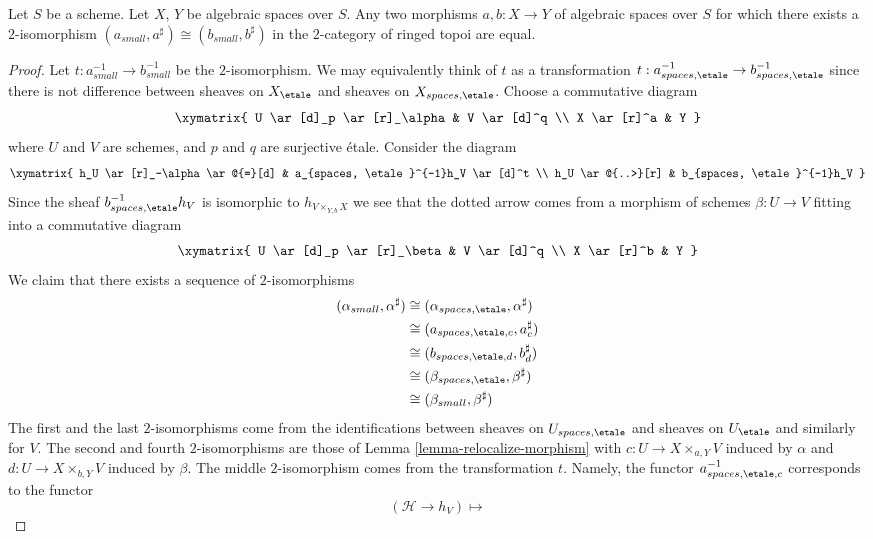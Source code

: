 \begin{lemma}
\label{lemma-faithful}
Let $S$ be a scheme.
Let $X$, $Y$ be algebraic spaces over $S$.
Any two morphisms $a, b : X \to Y$ of algebraic spaces over $S$
for which there exists a $2$-isomorphism
$(a_{small}, a^\sharp) \cong (b_{small}, b^\sharp)$
in the $2$-category of ringed topoi are equal.
\end{lemma}

\begin{proof}
Let $t : a_{small}^{-1} \to b_{small}^{-1}$ be the $2$-isomorphism.
We may equivalently think of $t$ as a transformation
$t : a_{spaces, \etale}^{-1} \to b_{spaces, \etale}^{-1}$
since there is not difference between sheaves on $X_\etale$
and sheaves on $X_{spaces, \etale}$.
Choose a commutative diagram
$$
\xymatrix{
U \ar[d]_p \ar[r]_\alpha  & V \ar[d]^q \\
X \ar[r]^a & Y
}
$$
where $U$ and $V$ are schemes, and $p$ and $q$ are surjective \'etale.
Consider the diagram
$$
\xymatrix{
h_U \ar[r]_-\alpha \ar@{=}[d] & a_{spaces, \etale}^{-1}h_V \ar[d]^t \\
h_U \ar@{..>}[r] & b_{spaces, \etale}^{-1}h_V
}
$$
Since the sheaf $b_{spaces, \etale}^{-1}h_V$ is isomorphic to
$h_{V \times_{Y, b} X}$ we see that the dotted arrow comes from a
morphism of schemes
$\beta : U \to V$ fitting into a commutative diagram
$$
\xymatrix{
U \ar[d]_p \ar[r]_\beta  & V \ar[d]^q \\
X \ar[r]^b & Y
}
$$
We claim that there exists a sequence of $2$-isomorphisms
\begin{align*}
(\alpha_{small}, \alpha^\sharp)
& \cong
(\alpha_{spaces, \etale}, \alpha^\sharp) \\
& \cong
(a_{spaces, \etale, c}, a_c^\sharp) \\
& \cong
(b_{spaces, \etale, d}, b_d^\sharp) \\
& \cong
(\beta_{spaces, \etale}, \beta^\sharp) \\
& \cong
(\beta_{small}, \beta^\sharp)
\end{align*}
The first and the last $2$-isomorphisms come from the identifications
between sheaves on $U_{spaces, \etale}$ and sheaves on
$U_\etale$ and similarly for $V$. The second and fourth
$2$-isomorphisms are those of
Lemma \ref{lemma-relocalize-morphism}
with $c : U \to X \times_{a, Y} V$ induced by $\alpha$ and
$d : U \to X \times_{b, Y} V$ induced by $\beta$.
The middle $2$-isomorphism comes from the transformation $t$.
Namely, the functor $a_{spaces, \etale, c}^{-1}$ corresponds
to the functor
$$
(\mathcal{H} \to h_V) \longmapsto
$$
\end{proof}
